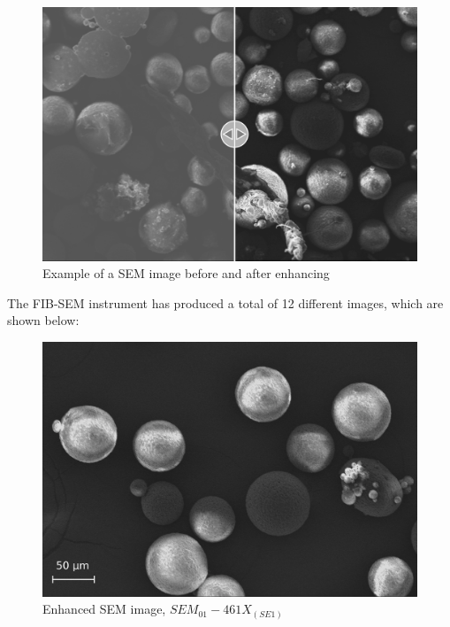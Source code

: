 \documentclass{article}
\begin{document}
                \begin{figure}[h!]
                    \centering
                    \includegraphics[width=\textwidth]{Pictures/SEM/Edited/unedited_vs_edited.png}
                    \caption{Example of a SEM image before and after enhancing \autocites{Inkscape}{Pixelmator_Pro}}
                    \label{fig:SEM_edited_vs_unedited}
                \end{figure}
                
            The FIB-SEM instrument has produced a total of 12 different images, which are shown below: \\

                \begin{figure}[h!]
                    \centering 
                    \includegraphics[width=\textwidth]{Pictures/SEM/Edited/04_01.eps}
                    \caption{Enhanced SEM image, $SEM_{01}-461X_{(SE1)}$ \autocites{Pixelmator_Pro}{GIMP}}
                    \label{fig:SEM_01}
                \end{figure}
\end{document}
